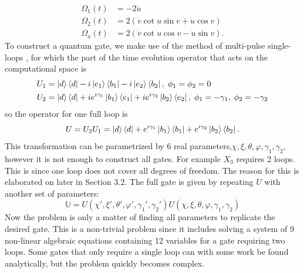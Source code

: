 \begin{equation}
\begin{aligned}
\Omega_1(t) &= -2\dot{u}
\\ 
\Omega_2(t) &= 2\left(\dot{v}\cot u\sin v + \dot{u}\cos v \right)
\\
\Omega_a(t) &= 2\left(\dot{v}\cot u\cos v - \dot{u}\sin v \right).
\end{aligned}
\end{equation}
To construct a quantum gate, we make use of the method of multi-pulse single-loops \cite{sLoop}, for which the part of the time evolution operator that acts on the computational space is
\begin{equation}
\begin{aligned}&
U_1 = \ket{d}\bra{d} -i\ket{e_1}\bra{b_1} -i\ket{e_2}\bra{b_2},\; \phi_1 = \phi_2 = 0
\\&
U_2 = \ket{d}\bra{d} +ie^{i\gamma_1}\ket{b_1}\bra{e_1} +ie^{i\gamma_2}\ket{b_2}\bra{e_2},\; \phi_1 = -\gamma_1,\; \phi_2 = -\gamma_2
\end{aligned}
\end{equation}
so the operator for one full loop is 
\begin{equation}
\label{eq:trit-gate-1-loop}
U = U_2U_1 = \ket{d}\bra{d} + e^{i\gamma_1}\ket{b_1}\bra{b_1} + e^{i\gamma_2}\ket{b_2}\bra{b_2}.
\end{equation}
This transformation can be parametrized by $6$ real parameters,$\chi,\xi,\theta,\varphi,\gamma_1,\gamma_2$, however it is not enough to construct all gates. For example $X_3$ requires 2 loops. This is since one loop does not cover all degrees of freedom. The reason for this is elaborated on later in Section 3.2. The full gate is given by repeating $U$ with another set of parameters:
\begin{equation}
\label{eq:trit-gate-2-loop}
\mathbb{U} = U(\chi',\xi',\theta',\varphi',\gamma_1',\gamma_2') U(\chi,\xi,\theta,\varphi,\gamma_1,\gamma_2)
\end{equation}
Now the problem is only a matter of finding all parameters to replicate the desired gate. This is a non-trivial problem since it includes solving a system of 9 non-linear algebraic equations containing 12 variables for a gate requiring two loops. Some gates that only require a single loop can with some work be found analytically, but the problem quickly becomes complex.

